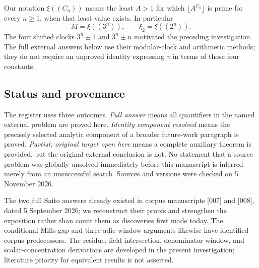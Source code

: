 \documentclass[11pt,a4paper]{article}
\numberwithin{equation}{section}
\theoremstyle{definition}
\theoremstyle{remark}
\begin{document}
Our notation $\xi((C_n))$ means the least $A>1$ for which
$\lfloor A^{C_n}\rfloor$ is prime for every $n\ge1$, when that
least value exists. In particular
\[
 M=\xi((3^n)),\qquad \xi_2=\xi((2^n)).
\]
The four shifted clocks $3^n\pm1$ and $3^n\pm n$ motivated the
preceding investigation. The full external answers below use their
modular-clock and arithmetic methods; they do not require an unproved
identity expressing $\gamma$ in terms of those four constants.

\subsection{Status and provenance}

The register uses three outcomes. \emph{Full answer} means all
quantifiers in the named external problem are proved here.
\emph{Identity component resolved} means the precisely selected
analytic component of a broader future-work paragraph is proved.
\emph{Partial; original target open here} means a complete auxiliary
theorem is provided, but the original external conclusion is not.
No statement that a source problem was globally unsolved immediately
before this manuscript is inferred merely from an unsuccessful search.
Sources and versions were checked on 5 November 2026.

The two full Saito answers already existed in corpus manuscripts
[007] and [008], dated 5 September 2026; we reconstruct their proofs
and strengthen the exposition rather than count them as discoveries
first made today. The conditional Mills-gap and three-adic-window
arguments likewise have identified corpus predecessors. The residue,
field-intersection, denominator-window, and scalar-concentration
derivations are developed in the present investigation; literature
priority for equivalent results is not asserted.
\end{document}

